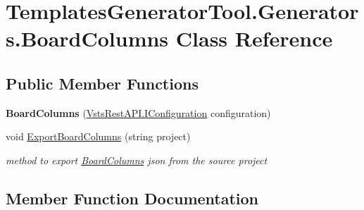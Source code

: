 \hypertarget{class_templates_generator_tool_1_1_generators_1_1_board_columns}{}\section{Templates\+Generator\+Tool.\+Generators.\+Board\+Columns Class Reference}
\label{class_templates_generator_tool_1_1_generators_1_1_board_columns}
\subsection*{Public Member Functions}
\begin{DoxyCompactItemize}
\item 
\mbox{\label{class_templates_generator_tool_1_1_generators_1_1_board_columns_a2cf1afb0c72bee7188a14311079ef8d5}} 
{\bfseries Board\+Columns} (\mbox{\hyperlink{interface_vsts_rest_a_p_i_1_1_i_configuration}{Vsts\+Rest\+A\+P\+I.\+I\+Configuration}} configuration)
\item 
void \mbox{\hyperlink{class_templates_generator_tool_1_1_generators_1_1_board_columns_aada06c13642a29046cb06f3d2ef2e322}{Export\+Board\+Columns}} (string project)
\begin{DoxyCompactList}\small\item\em method to export \mbox{\hyperlink{class_templates_generator_tool_1_1_generators_1_1_board_columns}{Board\+Columns}} json from the source project \end{DoxyCompactList}\end{DoxyCompactItemize}


\subsection{Member Function Documentation}
\mbox{\label{class_templates_generator_tool_1_1_generators_1_1_board_columns_aada06c13642a29046cb06f3d2ef2e322}} 
